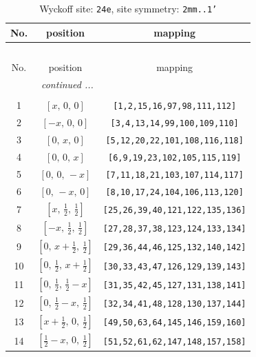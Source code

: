 \documentclass[fleqn,8pt]{jsarticle}
\begin{document}
\begin{longtable}{ccc}
\caption{Wyckoff site: {\tt 24e}, site symmetry: {\tt 2mm..1'}}
 \\
 \hline \hline
No. & position & mapping \\ \hline \endfirsthead

\multicolumn{2}{l}{\tablename\ \thetable{}} \\
 \hline \hline
No. & position & mapping \\ \hline \endhead

 \hline \hline
\multicolumn{2}{r}{\footnotesize\it continued ...} \\ \endfoot

 \hline \hline
\multicolumn{2}{r}{} \\ \endlastfoot

1 & $\left[ x,\, 0,\, 0 \right]$ & {\tt [1,2,15,16,97,98,111,112]} \\ \hline
2 & $\left[ - x,\, 0,\, 0 \right]$ & {\tt [3,4,13,14,99,100,109,110]} \\ \hline
3 & $\left[ 0,\, x,\, 0 \right]$ & {\tt [5,12,20,22,101,108,116,118]} \\ \hline
4 & $\left[ 0,\, 0,\, x \right]$ & {\tt [6,9,19,23,102,105,115,119]} \\ \hline
5 & $\left[ 0,\, 0,\, - x \right]$ & {\tt [7,11,18,21,103,107,114,117]} \\ \hline
6 & $\left[ 0,\, - x,\, 0 \right]$ & {\tt [8,10,17,24,104,106,113,120]} \\ \hline
7 & $\left[ x,\, \frac{1}{2},\, \frac{1}{2} \right]$ & {\tt [25,26,39,40,121,122,135,136]} \\ \hline
8 & $\left[ - x,\, \frac{1}{2},\, \frac{1}{2} \right]$ & {\tt [27,28,37,38,123,124,133,134]} \\ \hline
9 & $\left[ 0,\, x + \frac{1}{2},\, \frac{1}{2} \right]$ & {\tt [29,36,44,46,125,132,140,142]} \\ \hline
10 & $\left[ 0,\, \frac{1}{2},\, x + \frac{1}{2} \right]$ & {\tt [30,33,43,47,126,129,139,143]} \\ \hline
11 & $\left[ 0,\, \frac{1}{2},\, \frac{1}{2} - x \right]$ & {\tt [31,35,42,45,127,131,138,141]} \\ \hline
12 & $\left[ 0,\, \frac{1}{2} - x,\, \frac{1}{2} \right]$ & {\tt [32,34,41,48,128,130,137,144]} \\ \hline
13 & $\left[ x + \frac{1}{2},\, 0,\, \frac{1}{2} \right]$ & {\tt [49,50,63,64,145,146,159,160]} \\ \hline
14 & $\left[ \frac{1}{2} - x,\, 0,\, \frac{1}{2} \right]$ & {\tt [51,52,61,62,147,148,157,158]} \\ \hline

\end{longtable}
\end{document}

